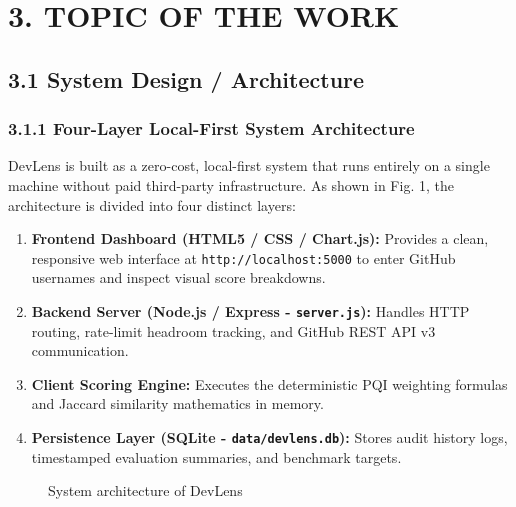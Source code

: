 \documentclass[12pt,a4paper]{article}
\begin{document}
\section{3. TOPIC OF THE WORK}

\subsection{3.1 System Design / Architecture}

\subsubsection{3.1.1 Four-Layer Local-First System Architecture}
DevLens is built as a zero-cost, local-first system that runs entirely on a single machine without paid third-party infrastructure. As shown in Fig. 1, the architecture is divided into four distinct layers:
\begin{enumerate}
    \item \textbf{Frontend Dashboard (HTML5 / CSS / Chart.js):} Provides a clean, responsive web interface at \texttt{http://localhost:5000} to enter GitHub usernames and inspect visual score breakdowns.
    \item \textbf{Backend Server (Node.js / Express - \texttt{server.js}):} Handles HTTP routing, rate-limit headroom tracking, and GitHub REST API v3 communication.
    \item \textbf{Client Scoring Engine:} Executes the deterministic PQI weighting formulas and Jaccard similarity mathematics in memory.
    \item \textbf{Persistence Layer (SQLite - \texttt{data/devlens.db}):} Stores audit history logs, timestamped evaluation summaries, and benchmark targets.
\end{enumerate}

\begin{figure}[h!]
\centering
\vspace{0.3cm}
\vspace{0.3cm}
\caption{System architecture of DevLens}
\end{figure}
\end{document}
